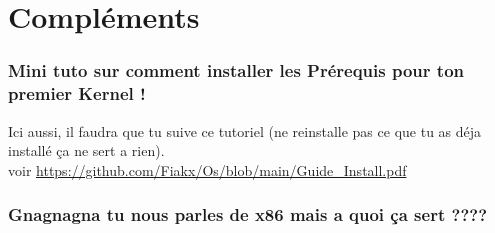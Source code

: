 \documentclass{article}
\begin{document}
\section*{Compléments}
\subsubsection*{Mini tuto sur comment installer les Prérequis pour ton premier Kernel !}
\begin{figure}[h]
    \label{fig:tutoinstalltt}
\end{figure}
Ici aussi, il faudra que tu suive ce tutoriel (ne reinstalle pas ce que tu as déja installé ça ne sert a rien).\\
voir \url{https://github.com/Fiakx/Os/blob/main/Guide_Install.pdf}

\subsubsection*{Gnagnagna tu nous parles de x86 mais a quoi ça sert ????}
\begin{figure}[h]
    \label{fig:x86}
\end{figure}
\end{document}

